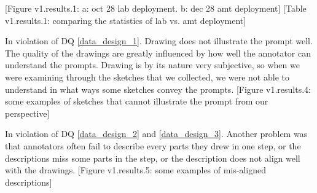 [Figure v1.results.1: a: oct 28 lab deployment. b: dec 28 amt deployment]
[Table v1.results.1: comparing the statistics of lab vs. amt deployment]

In violation of DQ \ref{data_design_1}. Drawing does not illustrate the prompt well. The quality of the drawings are greatly influenced by how well the annotator can understand the prompts. Drawing is by its nature very subjective, so when we were examining through the sketches that we collected, we were not able to understand in what ways some sketches convey the prompts. 
[Figure v1.results.4: some examples of sketches that cannot illustrate the prompt from our perspective]

In violation of DQ \ref{data_design_2} and \ref{data_design_3}. Another problem was that annotators often fail to describe every parts they drew in one step, or the descriptions miss some parts in the step, or the description does not align well with the drawings.   
[Figure v1.results.5: some examples of mis-aligned descriptions]